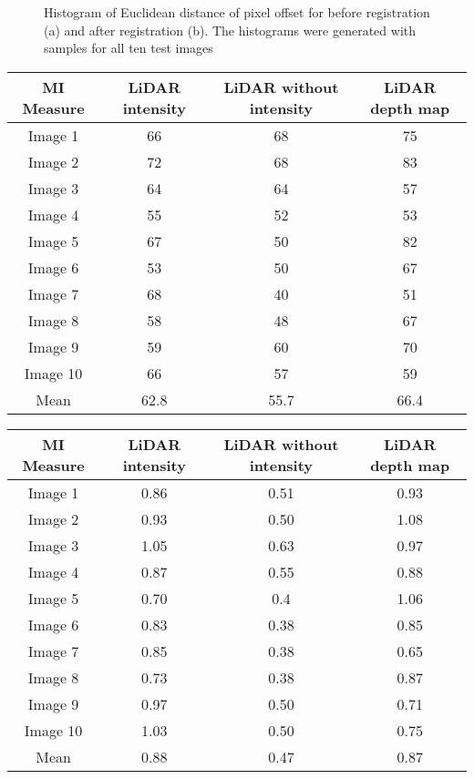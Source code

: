\begin{figure}[H]
\centering
{} 
\hspace{.1in}
\caption{Histogram of Euclidean distance of pixel offset for before registration (a) and after registration (b). The histograms were generated with samples for all ten test images } 
\label{fig:C5:hist_registration}
\end{figure}

\begin{table}
\centering
{}
\begin{tabular}{c| c| c| c }
 MI Measure & LiDAR intensity & LiDAR without intensity & LiDAR depth map \\
\hline
Image 1 &  66 & 68 & 75 \\
Image 2 &  72 & 68 & 83 \\
Image 3 &  64 & 64 & 57 \\
Image 4 &  55 & 52 & 53 \\
Image 5 &  67 & 50 & 82 \\
Image 6 &  53 & 50 & 67 \\
Image 7 &  68 & 40 & 51 \\
Image 8 &  58 & 48 & 67 \\
Image 9 &  59 & 60 & 70 \\
Image 10 & 66 & 57 & 59 \\
\hline
Mean       &  62.8  &  55.7   &  66.4     \\
\end{tabular}
\label{table:C5:iterations}
\end{table}

\begin{table}
\centering
{}
\begin{tabular}{c| c| c| c }
 MI Measure & LiDAR intensity & LiDAR without intensity & LiDAR depth map \\
\hline
Image 1 &  0.86 & 0.51 & 0.93 \\
Image 2 &  0.93 & 0.50 & 1.08 \\
Image 3 &  1.05 & 0.63 & 0.97 \\
Image 4 &  0.87 & 0.55 & 0.88 \\
Image 5 &  0.70 & 0.4 & 1.06 \\
Image 6 &  0.83 & 0.38 & 0.85 \\
Image 7 &  0.85 & 0.38 & 0.65 \\
Image 8 &  0.73 & 0.38 & 0.87 \\
Image 9 &  0.97 & 0.50 & 0.71 \\
Image 10 & 1.03 & 0.50 & 0.75 \\
\hline
Mean       &  0.88  &  0.47   &  0.87    \\
\end{tabular}
\label{table:C5:times}
\end{table}

